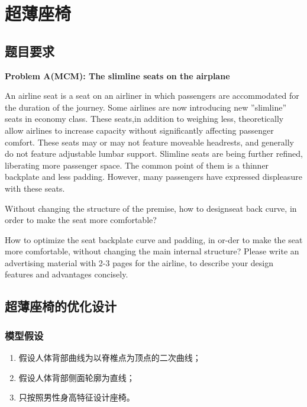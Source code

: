 % 
\chapter{超薄座椅}
\section{题目要求}
    \par
    \textbf{Problem A(MCM): The slimline seats on the airplane}
    \par
    An airline seat is a seat on an airliner in which passengers are accommodated for the duration of the journey. Some airlines are now introducing new ”slimline” seats in economy class. These seats,in addition to weighing less, theoretically allow airlines to increase capacity without significantly affecting passenger comfort. These seats may or may not feature moveable headrests, and generally do not feature adjustable lumbar support. Slimline seats are being further refined, liberating more passenger space. The common point of them is a thinner backplate and less padding. However, many passengers have expressed displeasure with these seats.
    \par
    Without changing the structure of the premise, how to designseat back curve, in order to make the seat more comfortable?
    \par
    How to optimize the seat backplate curve and padding, in or-der to make the seat more comfortable, without changing the main internal structure? Please write an advertising material with 2-3 pages for the airline, to describe your design features and advantages concisely.

\section{超薄座椅的优化设计}
    \subsection{模型假设}
        \begin{enumerate}
        \item 假设人体背部曲线为以脊椎点为顶点的二次曲线；
        \item 假设人体背部侧面轮廓为直线；
        \item 只按照男性身高特征设计座椅。
        \end{enumerate}
